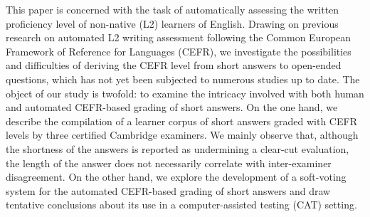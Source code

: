 This paper is concerned with the task of automatically assessing the written proficiency level of non-native (L2) learners of English. Drawing on previous research on automated L2 writing assessment following the Common European Framework of Reference for Languages (CEFR), we investigate the possibilities and difficulties of deriving the CEFR level from short answers to open-ended questions, which has not yet been subjected to numerous studies up to date. The object of our study is twofold: to examine the intricacy involved with both human and automated CEFR-based grading of short answers. On the one hand, we describe the compilation of a learner corpus of short answers graded with CEFR levels by three certified Cambridge examiners. We mainly observe that, although the shortness of the answers is reported as undermining a clear-cut evaluation, the length of the answer does not necessarily correlate with inter-examiner disagreement. On the other hand, we explore the development of a soft-voting system for the automated CEFR-based grading of short answers and draw tentative conclusions about its use in a computer-assisted testing (CAT) setting.
